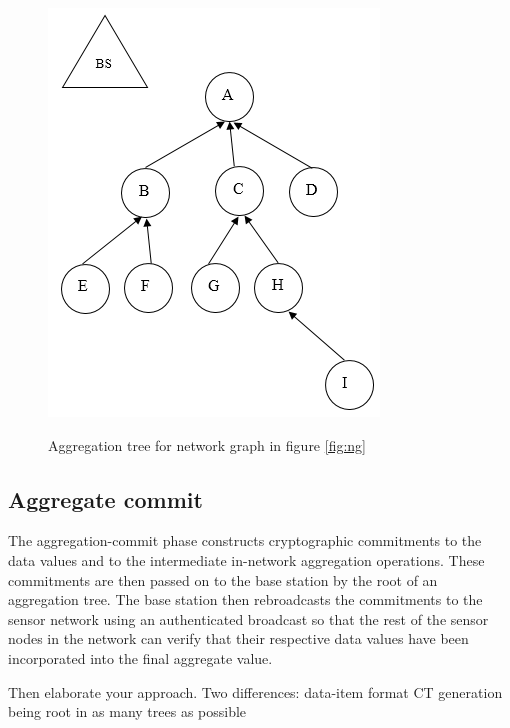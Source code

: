 		\begin{figure}[hp]
			\centering
			\includegraphics[scale = 0.7]{images/aggregation-tree.png}\\
			\caption{Aggregation tree for network graph in figure \ref{fig:ng}}
			\label{fig:at}
		\end{figure}		

	\subsection{Aggregate commit} 
		\label{sub:aggregate_commit}
		The aggregation-commit phase constructs cryptographic commitments to the data values and to the intermediate in-network aggregation operations.
		These commitments are then passed on to the base station by the root of an aggregation tree.
		The base station then rebroadcasts the commitments to the sensor network using an authenticated broadcast so that the rest of the sensor nodes in the network can verify that their respective data values have been incorporated into the final aggregate value.



Then elaborate your approach.
Two differences:
	data-item format
	CT generation being root in as many trees as possible